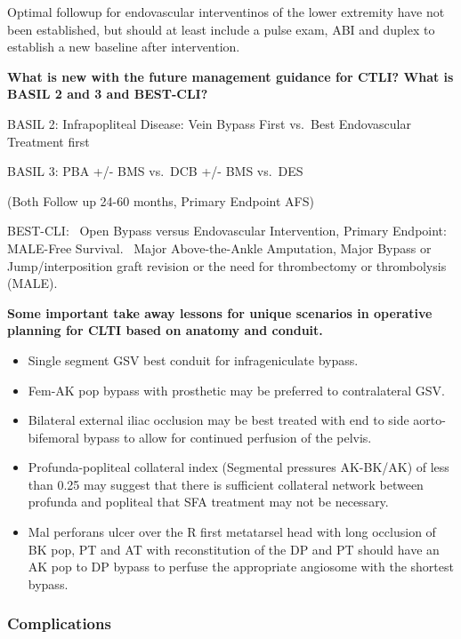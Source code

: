 \documentclass[
]{book}
\begin{document}
Optimal followup for endovascular interventinos of the lower extremity
have not been established, but should at least include a pulse exam, ABI
and duplex to establish a new baseline after intervention.\citep{zierler2018, mohler2012}

\textbf{What is new with the future management guidance for CTLI? What is
BASIL 2 and 3 and BEST-CLI?}

BASIL 2: Infrapopliteal Disease: Vein Bypass First vs.~Best Endovascular
Treatment first

BASIL 3: PBA +/- BMS vs.~DCB +/- BMS vs.~DES

(Both Follow up 24-60 months, Primary Endpoint AFS)

BEST-CLI:~ Open Bypass versus Endovascular Intervention, Primary
Endpoint: MALE-Free Survival.~ Major Above-the-Ankle Amputation, Major
Bypass or Jump/interposition graft revision or the need for thrombectomy
or thrombolysis (MALE).

\textbf{Some important take away lessons for unique scenarios in operative
planning for CLTI based on anatomy and conduit.}

\begin{itemize}
\item
  Single segment GSV best conduit for infrageniculate bypass.
  \citep{arvela2010, avgerinos2015, moreira2016}
\item
  Fem-AK pop bypass with prosthetic may be preferred to contralateral
  GSV. \citep{moreira2016}
\item
  Bilateral external iliac occlusion may be best treated with end to
  side aorto-bifemoral bypass to allow for continued perfusion of the
  pelvis. \citep{jaquinandi2008, vandenakker1992, brewster1978}
\item
  Profunda-popliteal collateral index (Segmental pressures AK-BK/AK)
  of less than 0.25 may suggest that there is sufficient collateral
  network between profunda and popliteal that SFA treatment may not be
  necessary. \citep{boren1980, mawatari2000}
\item
  Mal perforans ulcer over the R first metatarsel head with long
  occlusion of BK pop, PT and AT with reconstitution of the DP and PT
  should have an AK pop to DP bypass to perfuse the appropriate
  angiosome with the shortest bypass.\citep{hingorani2016, jongsma2017}
\end{itemize}

\hypertarget{complications-1}{%
\subsubsection{Complications}\label{complications-1}}
\end{document}
